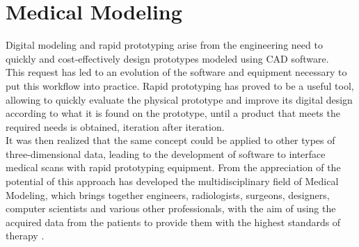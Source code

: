
\chapter{Medical Modeling} %

\label{Chapter3} %
 
 
 
Digital modeling and rapid prototyping arise from the engineering need to quickly and cost-effectively design prototypes modeled using CAD software.\\
This request has led to an evolution of the software and equipment necessary to put this workflow into practice. Rapid prototyping has proved to be a useful tool, allowing to quickly evaluate the physical prototype and improve its digital design according to what it is found on the prototype, until a product that meets the required needs is obtained, iteration after iteration. \\
It was then realized that the same concept could be applied to other types of three-dimensional data, leading to the development of software to interface medical scans with rapid prototyping equipment. From the appreciation of the potential of this approach has developed the multidisciplinary field of Medical Modeling, which brings together engineers, radiologists, surgeons, designers, computer scientists and various other professionals, with the aim of using the acquired data from the patients to provide them with the highest standards of therapy \parencite{Reference1}.

